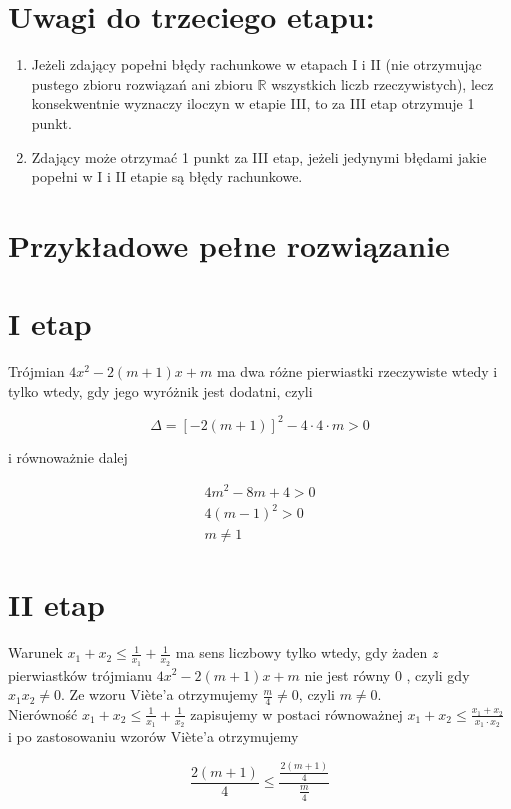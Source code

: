 \documentclass[10pt]{article}
\begin{document}
\section*{Uwagi do trzeciego etapu:}
\begin{enumerate}
  \item Jeżeli zdający popełni błędy rachunkowe w etapach I i II (nie otrzymując pustego zbioru rozwiązań ani zbioru $\mathbb{R}$ wszystkich liczb rzeczywistych), lecz konsekwentnie wyznaczy iloczyn w etapie III, to za III etap otrzymuje 1 punkt.
  \item Zdający może otrzymać 1 punkt za III etap, jeżeli jedynymi błędami jakie popełni w I i II etapie są błędy rachunkowe.
\end{enumerate}

\section*{Przykładowe pełne rozwiązanie}
\section*{I etap}
Trójmian $4 x^{2}-2(m+1) x+m$ ma dwa różne pierwiastki rzeczywiste wtedy i tylko wtedy, gdy jego wyróżnik jest dodatni, czyli

$$
\Delta=[-2(m+1)]^{2}-4 \cdot 4 \cdot m>0
$$

i równoważnie dalej

$$
\begin{gathered}
4 m^{2}-8 m+4>0 \\
4(m-1)^{2}>0 \\
m \neq 1
\end{gathered}
$$

\section*{II etap}
Warunek $x_{1}+x_{2} \leq \frac{1}{x_{1}}+\frac{1}{x_{2}}$ ma sens liczbowy tylko wtedy, gdy żaden $z$ pierwiastków trójmianu $4 x^{2}-2(m+1) x+m$ nie jest równy 0 , czyli gdy $x_{1} x_{2} \neq 0$. Ze wzoru Viète'a otrzymujemy $\frac{m}{4} \neq 0$, czyli $m \neq 0$.\\
Nierówność $x_{1}+x_{2} \leq \frac{1}{x_{1}}+\frac{1}{x_{2}}$ zapisujemy w postaci równoważnej $x_{1}+x_{2} \leq \frac{x_{1}+x_{2}}{x_{1} \cdot x_{2}}$ i po zastosowaniu wzorów Viète'a otrzymujemy

$$
\frac{2(m+1)}{4} \leq \frac{\frac{2(m+1)}{4}}{\frac{m}{4}}
$$
\end{document}
